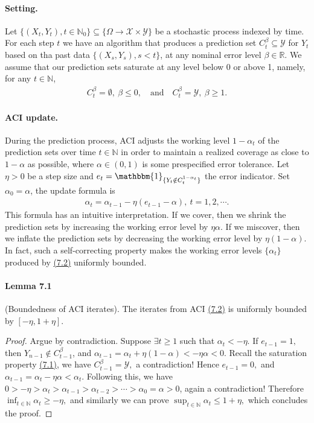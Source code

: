 \documentclass{article}
\numberwithin{equation}{section}
\begin{document}
\paragraph{Setting.} Let $\{(X_t,Y_t),t\in\mathbb{N}_0\}\subseteq\{\Omega\to\mathcal{X}\times\mathcal{Y}\}$ be a stochastic process indexed by time. For each step $t$ we have an algorithm that produces a prediction set $C^\beta_t\subseteq\mathcal{Y}$ for $Y_t$ based on tha past data $\{(X_s,Y_s),s<t\}$, at any nominal error level $\beta\in\mathbb{R}$.  We assume that our prediction sets saturate at any level below 0 or above 1, namely, for any $t\in\mathbb{N}$,
\begin{align*}
	C_t^\beta = \emptyset,\ \beta \leq 0,\quad\text{and}\quad C_t^\beta = \mathcal{Y},\ \beta \geq 1.\tag{7.1}\label{7.1}
\end{align*}
\paragraph{ACI update.} During the prediction process, ACI adjusts the working level $1-\alpha_t$ of the prediction sets over time $t\in\mathbb{N}$ in order to maintain a realized coverage as close to $1-\alpha$ as possible, where $\alpha\in(0,1)$ is some prespecified error tolerance. Let $\eta > 0$ be a step size and $e_t = \mathbbm{1}_{\{Y_t\notin C_t^{1-\alpha_t}\}}$ the error indicator. Set $\alpha_0=\alpha$, the update formula is
\begin{align*}
	\alpha_{t} = \alpha_{t-1} - \eta(e_{t-1} - \alpha),\ t=1,2,\cdots.\tag{7.2}\label{7.2}
\end{align*}
This formula has an intuitive interpretation. If we cover, then we shrink the prediction sets by increasing the working error level by $\eta\alpha$. If we miscover, then we inflate the prediction sets by decreasing the working error level by $\eta(1-\alpha)$. In fact, such a self-correcting property makes the working error levels $\{\alpha_t\}$ produced by \hyperref[7.2]{(7.2)} uniformly bounded.

\paragraph{Lemma 7.1 \label{Lemma 7.1}} (Boundedness of ACI iterates). The iterates from ACI \hyperref[7.2]{(7.2)} is uniformly bounded by $[-\eta,1+\eta].$
\begin{proof}
Argue by contradiction. Suppose $\exists t \geq 1$ such that $\alpha_t < -\eta$. If $e_{t-1} = 1,$ then $Y_{n-1}\notin C_{t-1}^\beta$, and $\alpha_{t-1} = \alpha_t + \eta(1-\alpha) < -\eta\alpha < 0$. Recall the saturation property \hyperref[7.1]{(7.1)},  we have $C_{t-1}^\beta = \mathcal{Y},$ a contradiction! Hence $e_{t-1} = 0,$ and $\alpha_{t-1} = \alpha_t -\eta\alpha < \alpha_t.$ Following this, we have $0 > -\eta > \alpha_t > \alpha_{t-1} > \alpha_{t-2} > \cdots > \alpha_0 = \alpha > 0$, again a contradiction! Therefore $\inf_{t\in\mathbb{N}}\alpha_t \geq -\eta,$ and similarly we can prove $\sup_{t\in\mathbb{N}}\alpha_t \leq 1+\eta,$ which concludes the proof.
\end{proof}
\end{document}
